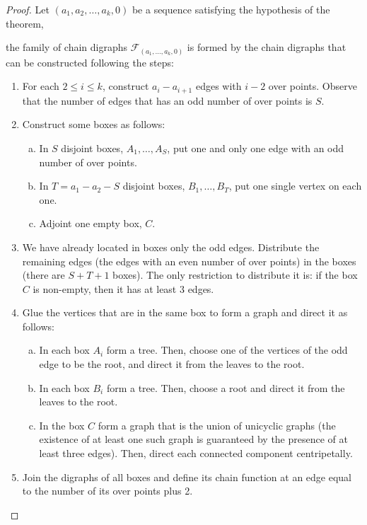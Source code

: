 \documentclass[a4paper,11pt]{amsart}
\theoremstyle{definition}
\theoremstyle{remark}
\numberwithin{equation}{section}
\newcommand{\g}{\mathfrak{g}}
\newcommand{\F}{\mathcal{F}}
\begin{document}
\begin{proof}
Let $(a_1, a_2, \dots, a_k,0)$ be a sequence satisfying the hypothesis of the theorem, 
the family of chain digraphs \(\mathcal{F}_{(a_1,\dots,a_k,0)}\) is formed by the chain digraphs that can be constructed following the steps:

\begin{enumerate}
\item For each \(2\leq i\leq k\), construct \(a_{i}-a_{i+1}\) edges with \(i-2\) over points. Observe that the number of edges that has an odd number of over points is \(S\). 
\item Construct some boxes as follows:
\begin{enumerate}[(a)]
\item In \(S\) disjoint boxes, \(A_1,\dots, A_{S}\), put one and only one edge with an odd number of over points. 
\item In \(T=a_1-a_2-S\) disjoint boxes, \(B_{1},\dots, B_{T}\), put one single vertex on each one. 
\item Adjoint one empty box, \(C\). 
\end{enumerate}
\item We have already located in boxes only the odd edges. Distribute the remaining edges (the edges with an even number of over points) in the boxes (there are \(S+T+1\) boxes). The only restriction to distribute it is: if the box \(C\) is non-empty, then it has at least 3 edges.  
\item Glue the vertices that are in the same box to form a graph and direct it as follows:
\begin{enumerate}[(a)]
\item In each box \(A_i\) form a tree. Then, choose one of the vertices of the odd edge to be the root, and direct it from the leaves to the root.   
\item In each box \(B_i\) form a tree. Then, choose a root and direct it from the leaves to the root.
\item In the box \(C\) form a graph that is the union of unicyclic graphs (the existence of at least one such graph is guaranteed by the presence of at least three edges). Then, direct each connected component centripetally.
\end{enumerate}
\item Join the digraphs of all boxes and define its chain function at an edge equal to the number of its over points plus 2.  
\end{enumerate}




\end{proof}
\end{document}
